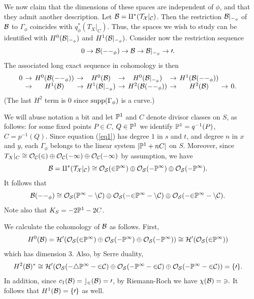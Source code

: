 We now claim that the dimensions of these spaces are independent of
$\phi$, and that they admit another description.
Let $\B=q^*(T_X|_C)$.  Then the restriction $\B|_{\Gamma_{\phi}}$
of $\B$ to $\Gamma_{\phi}$ coincides with $q_{\phi}^*(T_X|_C)$.
Thus, the spaces we wish to study can be identified with
$H^0(\B|_{\Gamma_{\phi}})$ and $H^1(\B|_{\Gamma_{\phi}})$.
Consider now the restriction sequence
\begin{equation} \label{eq2}
0\to\B(-\Gamma_{\phi})\to\B\to\B|_{\Gamma_{\phi}}\to0.
\end{equation}
The associated long exact sequence in cohomology is then
\begin{equation} \label{eq3}
{\arraycolsep 2pt
\begin{array}{ccccccccccc}
0 & \to &  H^0(\B(-\Gamma_{\phi})) & \to &  H^0(\B) & \to &
H^0(\B|_{\Gamma_{\phi}})  &
\to  & H^1(\B(-\Gamma_{\phi})) &  & \\
\hphantom{0} & \to  & H^1(\B) & \to &
H^1(\B|_{\Gamma_{\phi}})  & \to  & H^2(\B(-\Gamma_{\phi})) & \to  & H^2(\B) &
\to & 0.
\end{array}
}
\end{equation}
(The last $H^2$ term is 0 since $\supp(\Gamma_\phi)$ is a curve.)

We will abuse notation a bit and let $\P^1$ and $C$ denote divisor classes
on $S$, as follows:  for some fixed points $P\in C$, $Q\in \P^1$ we identify
$\P^1=q^{-1}(P)$, $C=p^{-1}(Q)$.  Since equation (\ref{eq1}) has
degree $1$ in $s$ and $t$, and degree $n$ in $x$ and $y$,
 each $\Gamma_{\phi}$ belongs to
the linear system $|\P^1+nC|$ on $S$.
Moreover, since $T_X|_{C}\cong \O_C(2)\oplus\O_C(-1)\oplus\O_C(-1)$ by
assumption, we have
\begin{equation}
\B=q^*(T_X|_C)\cong \O_S(2\P^1)\oplus\O_S(-\P^1)\oplus\O_S(-\P^1).
\end{equation}
It follows that
\begin{equation} \label{eq3.5}
\B(-\Gamma_{\phi})
\cong \O_S(\P^1-nC)\oplus\O_S(-2\P^1-nC)\oplus\O_S(-2\P^1-nC).
\end{equation}
Note also that $K_S=-2\P^1-2C$.

We calculate the cohomology of $\B$ as follows.  First,
\begin{equation}
H^0(\B)=H^0(\O_S(2\P^1)\oplus\O_S(-\P^1)\oplus\O_S(-\P^1))\cong
H^0(\O_S(2\P^1))
\end{equation}
which has dimension 3.  Also, by Serre duality,
\begin{equation}
H^2(\B)^*\cong
H^0(\O_S(-4\P^1-2C)\oplus\O_S(-\P^1-2C)\oplus\O_S(-\P^1-2C))=\{0\}.
\end{equation}
In addition, since $c_1(\B)=c_2(\B)=0$, by Riemann-Roch we have $\chi(\B)=3.$
It follows that $H^1(\B)=\{0\}$ as well.

